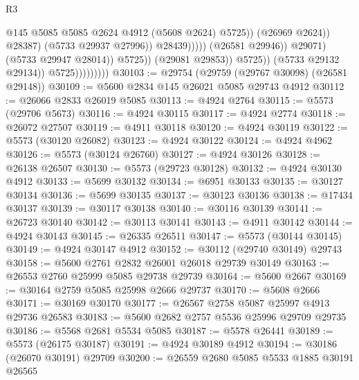 \begin{lexlean}{R3}
\begin{coremodule}
                                                            @145
                                                            @5085
                                                            @5085
                                                            @2624
                                                            @4912
                                                            (@5608 @2624)
                                                            @5725))
                                                        (@26969 @2624))
                                                      @28387)
                                                    (@5733 @29937 @27996))
                                                  @28439)))))
                                        (@26581 @29946))
                                      @29071)
                                    (@5733 @29947 @28014))
                                  @5725))
                              (@29081 @29853))
                            @5725))
                        (@5733 @29132 @29134))
                      @5725)))))))))
@30103 := @29754 (@29759 (@29767 @30098) (@26581 @29148))
@30109 := @5600 @2834 @145 @26021 @5085 @29743 @4912
@30112 := @26066 @2833 @26019 @5085
@30113 := @4924 @2764
@30115 := @5573 (@29706 @5673)
@30116 := @4924 @30115
@30117 := @4924 @2774
@30118 := @26072 @27507
@30119 := @4911 @30118
@30120 := @4924 @30119
@30122 := @5573 (@30120 @26082)
@30123 := @4924 @30122
@30124 := @4924 @4962
@30126 := @5573 (@30124 @26760)
@30127 := @4924 @30126
@30128 := @26138 @26507
@30130 := @5573 (@29723 @30128)
@30132 := @4924 @30130 @4912
@30133 := @5699 @30132
@30134 := @6951 @30133
@30135 := @30127 @30134
@30136 := @5699 @30135
@30137 := @30123 @30136
@30138 := @17434 @30137
@30139 := @30117 @30138
@30140 := @30116 @30139
@30141 := @26723 @30140
@30142 := @30113 @30141
@30143 := @4911 @30142
@30144 := @4924 @30143
@30145 := @26335 @26511
@30147 := @5573 (@30144 @30145)
@30149 := @4924 @30147 @4912
@30152 := @30112 (@29740 @30149) @29743
@30158 := @5600 @2761 @2832 @26001 @26018 @29739 @30149
@30163 := @26553 @2760 @25999 @5085 @29738 @29739
@30164 := @5600 @2667
@30169 := @30164 @2759 @5085 @25998 @2666 @29737
@30170 := @5608 @2666
@30171 := @30169 @30170
@30177 := @26567 @2758 @5087 @25997 @4913 @29736 @26583
@30183 := @5600 @2682 @2757 @5536 @25996 @29709 @29735
@30186 := @5568 @2681 @5534 @5085
@30187 := @5578 @26441
@30189 := @5573 (@26175 @30187)
@30191 := @4924 @30189 @4912
@30194 := @30186 (@26070 @30191) @29709
@30200 := @26559 @2680 @5085 @5533 @1885 @30191 @26565

\end{coremodule}
\end{lexlean}

